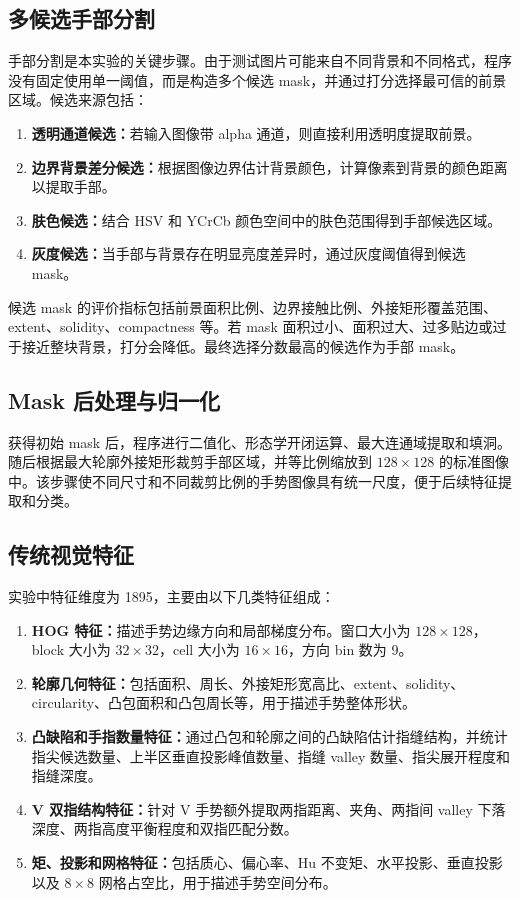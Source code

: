 \documentclass[11pt]{article}
\begin{document}
\subsection{多候选手部分割}

手部分割是本实验的关键步骤。由于测试图片可能来自不同背景和不同格式，程序没有固定使用单一阈值，而是构造多个候选 mask，并通过打分选择最可信的前景区域。候选来源包括：

\begin{enumerate}
    \item \textbf{透明通道候选：}若输入图像带 alpha 通道，则直接利用透明度提取前景。
    \item \textbf{边界背景差分候选：}根据图像边界估计背景颜色，计算像素到背景的颜色距离以提取手部。
    \item \textbf{肤色候选：}结合 HSV 和 YCrCb 颜色空间中的肤色范围得到手部候选区域。
    \item \textbf{灰度候选：}当手部与背景存在明显亮度差异时，通过灰度阈值得到候选 mask。
\end{enumerate}

候选 mask 的评价指标包括前景面积比例、边界接触比例、外接矩形覆盖范围、extent、solidity、compactness 等。若 mask 面积过小、面积过大、过多贴边或过于接近整块背景，打分会降低。最终选择分数最高的候选作为手部 mask。

\subsection{Mask 后处理与归一化}

获得初始 mask 后，程序进行二值化、形态学开闭运算、最大连通域提取和填洞。随后根据最大轮廓外接矩形裁剪手部区域，并等比例缩放到 $128 \times 128$ 的标准图像中。该步骤使不同尺寸和不同裁剪比例的手势图像具有统一尺度，便于后续特征提取和分类。

\subsection{传统视觉特征}

实验中特征维度为 1895，主要由以下几类特征组成：

\begin{enumerate}
    \item \textbf{HOG 特征：}描述手势边缘方向和局部梯度分布。窗口大小为 $128 \times 128$，block 大小为 $32 \times 32$，cell 大小为 $16 \times 16$，方向 bin 数为 9。
    \item \textbf{轮廓几何特征：}包括面积、周长、外接矩形宽高比、extent、solidity、circularity、凸包面积和凸包周长等，用于描述手势整体形状。
    \item \textbf{凸缺陷和手指数量特征：}通过凸包和轮廓之间的凸缺陷估计指缝结构，并统计指尖候选数量、上半区垂直投影峰值数量、指缝 valley 数量、指尖展开程度和指缝深度。
    \item \textbf{V 双指结构特征：}针对 V 手势额外提取两指距离、夹角、两指间 valley 下落深度、两指高度平衡程度和双指匹配分数。
    \item \textbf{矩、投影和网格特征：}包括质心、偏心率、Hu 不变矩、水平投影、垂直投影以及 $8 \times 8$ 网格占空比，用于描述手势空间分布。
\end{enumerate}
\end{document}
